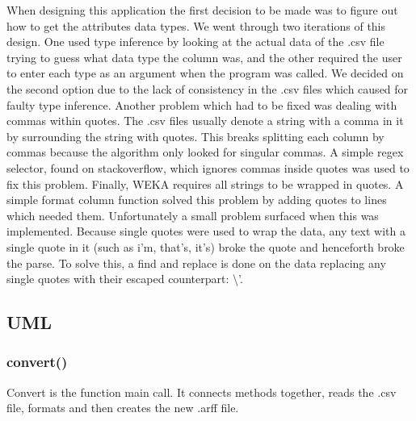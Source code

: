 \documentclass[11pt]{article} %
\begin{document}
When designing this application the first decision to be made was to figure out how to get the attributes data types. We went through two iterations of this design. One used type inference by looking at the actual data of the .csv file trying to guess what data type the column was, and the other required the user to enter each type as an argument when the program was called. We decided on the second option due to the lack of consistency in the .csv files which caused for faulty type inference. Another problem which had to be fixed was dealing with commas within quotes. The .csv files usually denote a string with a comma in it by surrounding the string with quotes. This breaks splitting each column by commas because the algorithm only looked for singular commas. A simple regex selector, found on stackoverflow, which ignores commas inside quotes was used to fix this problem. Finally, WEKA requires all strings to be wrapped in quotes. A simple format column function solved this problem by adding quotes to lines which needed them. Unfortunately a small problem surfaced when this was implemented. Because single quotes were used to wrap the data, any text with a single quote in it (such as i'm, that's, it's) broke the quote and henceforth broke the parse. To solve this, a find and replace is done on the data replacing any single quotes with their escaped counterpart: \textbackslash'.

\subsection{UML}
\begin{center}
\end{center}

\subsubsection{convert()}
Convert is the function main call. It connects methods together, reads the .csv file, formats and then creates the new .arff file.
\end{document}
